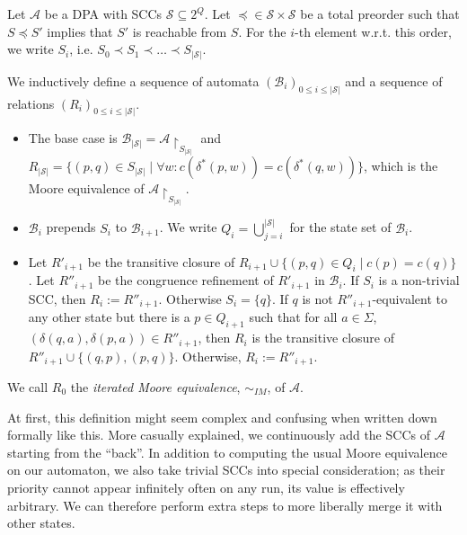 \begin{defn}
\label{def:fwe:itmoore}
	Let $\mathcal{A}$ be a DPA with SCCs $\mathcal{S} \subseteq 2^Q$. Let $\preceq \in \mathcal{S} \times \mathcal{S}$ be a total preorder such that $S \preceq S'$ implies that $S'$ is reachable from $S$. For the $i$-th element w.r.t. this order, we write $S_i$, i.e. $S_0 \prec S_1 \prec \dots \prec S_{|\mathcal{S}|}$.
	
	We inductively define a sequence of automata $(\mathcal{B}_i)_{0 \leq i \leq |\mathcal{S}|}$ and a sequence of relations $(R_i)_{0 \leq i \leq |\mathcal{S}|}$. 
	
	\begin{itemize}
		\item The base case is $\mathcal{B}_{|\mathcal{S}|} = \mathcal{A}\upharpoonright_{S_{|\mathcal{S}|}}$ and $R_{|\mathcal{S}|} = \{ (p, q) \in S_{|\mathcal{S}|} \mid \forall w: c(\delta^*(p, w)) = c(\delta^*(q, w))\}$, which is the Moore equivalence of $\mathcal{A}\upharpoonright_{S_{|\mathcal{S}|}}$.
		\item $\mathcal{B}_i$ prepends $S_i$ to $\mathcal{B}_{i+1}$. We write $Q_i = \bigcup_{j=i}^{|\mathcal{S}|}$ for the state set of $\mathcal{B}_i$.
		\item Let $R'_{i+1}$ be the transitive closure of $R_{i+1} \cup \{ (p, q) \in Q_i \mid c(p) = c(q)\}$. Let $R''_{i+1}$ be the congruence refinement of $R'_{i+1}$ in $\mathcal{B}_i$. If $S_i$ is a non-trivial SCC, then $R_i := R''_{i+1}$. Otherwise $S_i = \{q\}$. If $q$ is not $R''_{i+1}$-equivalent to any other state but there is a $p \in Q_{i+1}$ such that for all $a \in \Sigma$, $(\delta(q, a), \delta(p, a)) \in R''_{i+1}$, then $R_i$ is the transitive closure of $R''_{i+1} \cup \{(q, p), (p, q)\}$. Otherwise, $R_i := R''_{i+1}$.
	\end{itemize} 
	
	We call $R_0$ the \emph{iterated Moore equivalence}, $\sim_{IM}$, of $\mathcal{A}$.
\end{defn}

At first, this definition might seem complex and confusing when written down formally like this. %
More casually explained, we continuously add the SCCs of $\mathcal{A}$ starting from the \enquote{back}. In addition to computing the usual Moore equivalence on our automaton, we also take trivial SCCs into special consideration; as their priority cannot appear infinitely often on any run, its value is effectively arbitrary. We can therefore perform extra steps to more liberally merge it with other states.


